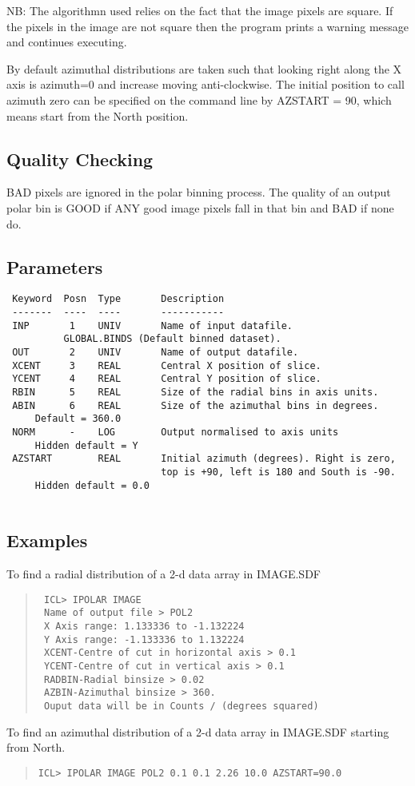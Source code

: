 \documentclass{book}
\renewcommand{\_}{{\tt\char'137}}     %
\begin{document}
NB: The algorithmn used relies on the fact that the image pixels are
square. If the pixels in the image are not square then the program
prints a warning message and continues executing.
 
By default azimuthal distributions are taken such that looking right
along the X axis is azimuth=0 and increase moving anti-clockwise.
The initial position to call azimuth zero can be specified on the
command line by AZSTART = 90, which means start from the North
position.
 
\subsection{Quality Checking}
BAD pixels are ignored in the polar binning process. The quality of
an output polar bin is GOOD if ANY good image pixels fall in that
bin and BAD if none do.
 
\subsection{Parameters}
\begin{verbatim}
 Keyword  Posn  Type       Description
 -------  ----  ----       -----------
 INP       1    UNIV       Name of input datafile.
          GLOBAL.BINDS (Default binned dataset).
 OUT       2    UNIV       Name of output datafile.
 XCENT     3    REAL       Central X position of slice.
 YCENT     4    REAL       Central Y position of slice.
 RBIN      5    REAL       Size of the radial bins in axis units.
 ABIN      6    REAL       Size of the azimuthal bins in degrees.
     Default = 360.0
 NORM      -    LOG        Output normalised to axis units
     Hidden default = Y
 AZSTART        REAL       Initial azimuth (degrees). Right is zero,
                           top is +90, left is 180 and South is -90.
     Hidden default = 0.0
 
\end{verbatim}\subsection{Examples}
To find a radial distribution of a 2-d data array in IMAGE.SDF
\begin{quote}\begin{verbatim}
 ICL> IPOLAR IMAGE
 Name of output file > POL2
 X Axis range: 1.133336 to -1.132224
 Y Axis range: -1.133336 to 1.132224
 XCENT-Centre of cut in horizontal axis > 0.1
 YCENT-Centre of cut in vertical axis > 0.1
 RADBIN-Radial binsize > 0.02
 AZBIN-Azimuthal binsize > 360.
 Ouput data will be in Counts / (degrees squared)
\end{verbatim}\end{quote}
To find an azimuthal distribution of a 2-d data array in IMAGE.SDF
starting from North.
\begin{quote}\begin{verbatim}
ICL> IPOLAR IMAGE POL2 0.1 0.1 2.26 10.0 AZSTART=90.0
\end{verbatim}\end{quote}
\end{document}
